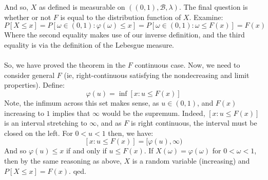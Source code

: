 \documentclass[12pt,a4paper]{article}
\newcommand{\1}[1]{\mathbbm{1}\left\{ #1 \right\}}
\newcommand{\bcal}{\mathcal{B}}
\begin{document}
\\\\
And so, $X$ as defined is measurable on $((0,1),\bcal,\lambda)$. The final question is whether or not $F$ is equal to the distribution function of $X$. Examine:
$$
	P[X \leq x] = P[\omega \in (0,1) : \varphi(\omega) \leq x] = P[\omega \in (0,1) : \omega \leq F(x)] = F(x)
$$
Where the second equality makes use of our inverse definition, and the third equality is via the definition of the Lebesgue measure.
\\\\
So, we have proved the theorem in the $F$ continuous case. Now, we need to consider general $F$ (ie, right-continuous satisfying the nondecreasing and limit properties). Define:
$$
	\varphi(u) = \inf\left[x : u \leq F(x)\right]
$$
Note, the infimum across this set makes sense, as $u \in (0,1)$, and $F(x)$ increasing to $1$ implies that $\infty$ would be the supremum. Indeed, $[x : u \leq F(x)]$ is an interval stretching to $\infty$, and as $F$ is right continuous, the interval must be closed on the left. For $0 < u < 1$ then, we have:
$$
	[x : u \leq F(x)] = [\varphi(u),\infty)
$$
And so $\varphi(u) \leq x$ if and only if $u \leq F(x)$. If $X(\omega) = \varphi(\omega)$ for $0 < \omega < 1$, then by the same reasoning as above, $X$ is a random variable (increasing) and $P[X \leq x] = F(x)$. qed.
\end{document}
